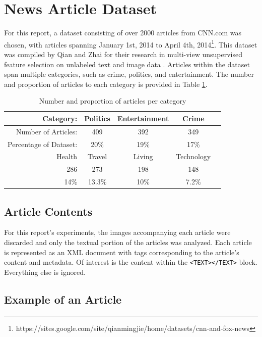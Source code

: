 \documentclass[11pt]{article}
\begin{document}
\section{News Article Dataset} \label{sec:dataset}

For this report, a dataset consisting of over 2000 articles from CNN.com was chosen, with articles spanning January 1st, 2014 to April 4th, 2014\footnote{
https://sites.google.com/site/qianmingjie/home/datasets/cnn-and-fox-news
}.
This dataset was compiled by Qian and Zhai for their research in multi-view unsupervised feature selection on unlabeled text and image data \cite{qian2014unsupervised}.
Articles within the dataset span multiple categories, such as crime, politics, and entertainment.
The number and proportion of articles to each category is provided in Table \ref{tab:categories}.

\begin{table}[h]
	\centering
	\begin{tabular}{ r c c c c  }
		\hline
	Category: &              Politics & Entertainment & Crime & \\ \hline
	Number of Articles: &    409 &      392 &           349 & \\ \hline
	Percentage of Dataset: & 20\% &    19\% &           17\% & \\
	  \hline
	  \hline
	   Health & Travel & Living & Technology \\ \hline
	   286    & 273    & 198    & 148 \\ \hline
	   14\%   & 13.3\% & 10\%   & 7.2\% \\
	\hline
	\end{tabular}
	
	\caption{Number and proportion of articles per category}
	\label{tab:categories}
\end{table}


\subsection{Article Contents}

For this report's experiments, the images accompanying each article were discarded and only the textual portion of the articles was analyzed.
Each article is represented as an XML document with tags corresponding to the article's content and metadata.
Of interest is the content within the \texttt{<TEXT></TEXT>} block.
Everything else is ignored.

\pagebreak
\subsection{Example of an Article}
\end{document}
